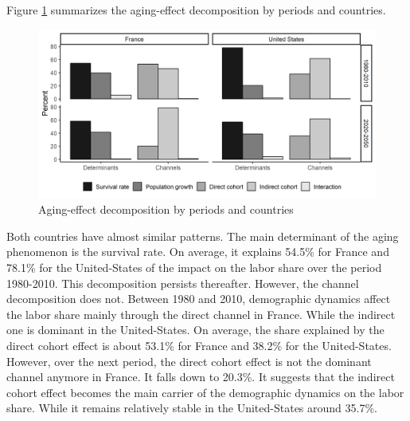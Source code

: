 Figure \ref{fig:decomp_country_period} summarizes the aging-effect decomposition by periods and countries.
\begin{figure}[tb]
	\centering
	\includegraphics[width=1\linewidth]{../result/decomposition/decomp_country_period.png}
	\caption{Aging-effect decomposition by periods and countries}
	\label{fig:decomp_country_period}
\end{figure}
Both countries have almost similar patterns. The main determinant of the aging phenomenon is the survival rate. On average, it explains 54.5\% for France and 78.1\% for the United-States of the impact on the labor share over the period 1980-2010. This decomposition persists thereafter. However, the channel decomposition does not. Between 1980 and 2010, demographic dynamics affect the labor share mainly through the direct channel in France. While the indirect one is dominant in the United-States. On average, the share explained by the direct cohort effect is about 53.1\% for France and 38.2\% for the United-States. However, over the next period, the direct cohort effect is not the dominant channel anymore in France. It falls down to 20.3\%. It suggests that the indirect cohort effect becomes the main carrier of the demographic dynamics on the labor share. While it remains relatively stable in the United-States around 35.7\%.



